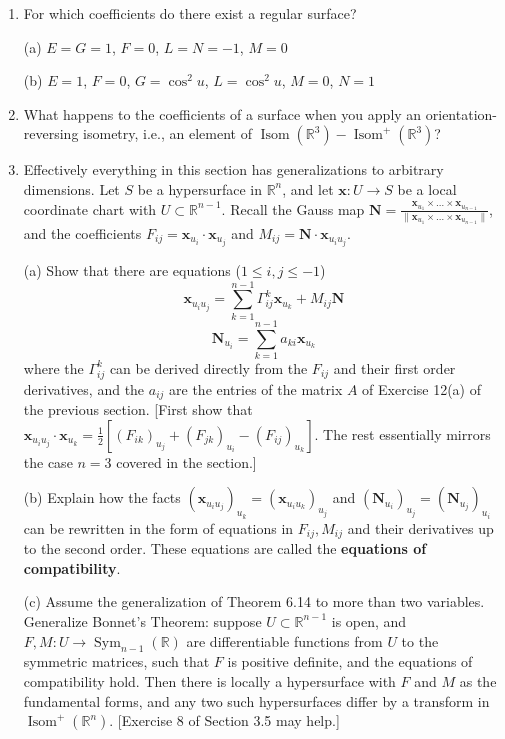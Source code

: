 \documentclass[leqno]{book}
\begin{document}
\begin{enumerate}
\item For which coefficients do there exist a regular surface?

(a) $E=G=1$, $F=0$, $L=N=-1$, $M=0$

(b) $E=1$, $F=0$, $G=\cos^2u$, $L=\cos^2u$, $M=0$, $N=1$

\item What happens to the coefficients of a surface when you apply an orientation-reversing isometry, i.e., an element of $\operatorname{Isom}(\mathbb R^3)-\operatorname{Isom}^+(\mathbb R^3)$? %

\item Effectively everything in this section has generalizations to arbitrary dimensions.  Let $S$ be a hypersurface in $\mathbb R^n$, and let $\mathbf x:U\to S$ be a local coordinate chart with $U\subset\mathbb R^{n-1}$. %
Recall the Gauss map $\mathbf N=\frac{\mathbf x_{u_1}\times\dots\times\mathbf x_{u_{n-1}}}{\|\mathbf x_{u_1}\times\dots\times\mathbf x_{u_{n-1}}\|}$, and the coefficients $F_{ij}=\mathbf x_{u_i}\cdot\mathbf x_{u_j}$ and $M_{ij}=\mathbf N\cdot\mathbf x_{u_iu_j}$.

(a) Show that there are equations ($1\leqslant i,j\leqslant -1$)
$$\mathbf x_{u_iu_j}=\sum_{k=1}^{n-1}\Gamma_{ij}^k\mathbf x_{u_k}+M_{ij}\mathbf N$$
$$\mathbf N_{u_i}=\sum_{k=1}^{n-1}a_{ki}\mathbf x_{u_k}$$
where the $\Gamma_{ij}^k$ can be derived directly from the $F_{ij}$ and their first order derivatives, and the $a_{ij}$ are the entries of the matrix $A$ of Exercise 12(a) of the previous section.  [First show that $\mathbf x_{u_iu_j}\cdot\mathbf x_{u_k}=\frac 12\left[(F_{ik})_{u_j}+(F_{jk})_{u_i}-(F_{ij})_{u_k}\right]$.  The rest essentially mirrors the case $n=3$ covered in the section.]

(b) Explain how the facts $(\mathbf x_{u_iu_j})_{u_k}=(\mathbf x_{u_iu_k})_{u_j}$ and $(\mathbf N_{u_i})_{u_j}=(\mathbf N_{u_j})_{u_i}$ can be rewritten in the form of equations in $F_{ij},M_{ij}$ and their derivatives up to the second order.  These equations are called the \textbf{equations of compatibility}.

(c) Assume the generalization of Theorem 6.14 to more than two variables.  Generalize Bonnet's Theorem: suppose $U\subset\mathbb R^{n-1}$ is open, and $F,M:U\to\operatorname{Sym}_{n-1}(\mathbb R)$ are differentiable functions from $U$ to the symmetric matrices, such that $F$ is positive definite, and the equations of compatibility hold.  Then there is locally a hypersurface with $F$ and $M$ as the fundamental forms, and any two such hypersurfaces differ by a transform in $\operatorname{Isom}^+(\mathbb R^n)$.  [Exercise 8 of Section 3.5 may help.]


\end{enumerate}
\end{document}

